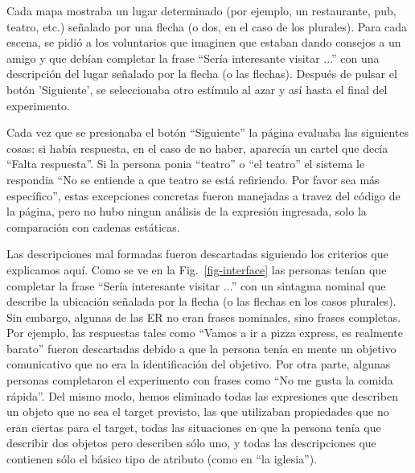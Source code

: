 Cada mapa mostraba un lugar determinado (por ejemplo, un restaurante, pub, teatro, etc.) se\~nalado por una flecha (o dos, en el caso de los plurales). Para cada escena, se pidi\'o a los voluntarios que imaginen que estaban dando consejos a un amigo y que deb\'{i}an completar la frase ``Ser\'{i}a interesante visitar ...'' con una descripci\'on del lugar se\~nalado por la flecha (o las flechas). Despu\'es de pulsar el bot\'on 'Siguiente', se seleccionaba otro est\'{i}mulo al azar y as\'{i} hasta el final del experimento.


Cada vez que se presionaba el bot\'on ``Siguiente'' la p\'agina evaluaba las siguientes cosas:  si hab\'ia respuesta, en el caso de no haber, aparec\'ia un cartel que dec\'ia ``Falta respuesta''.
Si la persona ponia ``teatro'' o ``el teatro'' el sistema le respondia ``No se entiende a que teatro se est\'a refiriendo. Por favor sea m\'as espec\'ifico'', estas excepciones concretas fueron manejadas a travez del c\'odigo  de la p\'agina, pero no hubo ningun an\'alisis de la expresi\'on ingresada, solo la comparaci\'on con cadenas est\'aticas.

Las descripciones mal formadas fueron descartadas siguiendo los criterios que explicamos aqu\'{i}. Como se ve en la Fig.~\ref{fig-interface} las personas ten\'{i}an que completar la frase ``Ser\'{i}a interesante visitar ...'' con un sintagma nominal que describe la ubicaci\'on se\~nalada por la flecha (o las flechas en los casos plurales). Sin embargo, algunas de las ER no eran frases nominales, sino frases completas. Por ejemplo, las respuestas tales como ``Vamos a ir a pizza express, es realmente barato'' fueron descartadas debido a que la persona ten\'{i}a en mente un objetivo comunicativo que no era la identificaci\'on del objetivo. Por otra parte, algunas personas completaron el experimento con frases como ``No me gusta la comida r\'apida''. Del mismo modo, hemos eliminado todas las expresiones que describen un objeto que no sea el target previsto, las que utilizaban propiedades que no eran ciertas para el target, todas las situaciones en que la persona ten\'{i}a que describir dos objetos pero describen s\'olo uno, y todas las descripciones que contienen s\'olo el b\'asico tipo de atributo (como en ``la iglesia'').



